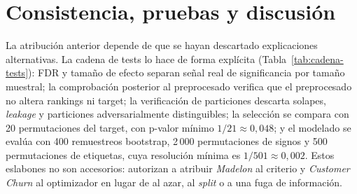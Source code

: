 \section{Consistencia, pruebas y discusión}
\label{sec:consistencia-discusion}

La atribución anterior depende de que se hayan descartado explicaciones
alternativas. La cadena de tests lo hace de forma explícita
(Tabla~\ref{tab:cadena-tests}): FDR y tamaño
de efecto separan señal real de significancia por tamaño muestral; la
comprobación posterior al preprocesado verifica que el preprocesado no altera
rankings ni target; la verificación de particiones descarta solapes,
\textit{leakage} y particiones adversarialmente distinguibles; la
selección se compara con 20 permutaciones del target, con p-valor mínimo
$1/21 \approx 0{,}048$; y el modelado se evalúa con 400 remuestreos
bootstrap, 2\,000 permutaciones de signos y 500 permutaciones de
etiquetas, cuya resolución mínima es $1/501 \approx 0{,}002$. Estos
eslabones no son accesorios: autorizan a atribuir \textit{Madelon} al
criterio y \textit{Customer Churn} al optimizador en lugar de al azar, al
\textit{split} o a una fuga de información.

